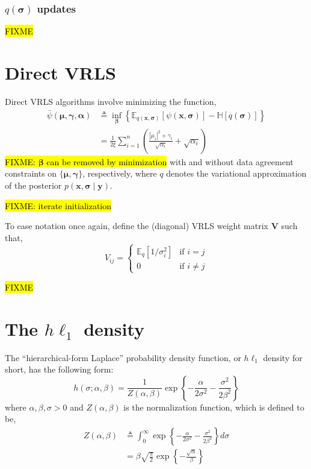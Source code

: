 \documentclass{article}
\newcommand{\m}[1]{\boldsymbol{#1}}
\newcommand{\E}[2]{\mathbb{E}_{#2}\left[ #1 \right]}
\newcommand{\entropy}[1]{\mathbb{H}\left[ #1 \right]}
\begin{document}
\subsubsection{$q(\m{\sigma})$ updates}
\hl{FIXME}

\section{Direct VRLS}
\label{s:vrls}
Direct VRLS algorithms involve minimizing the function,
\begin{equation}
\begin{aligned}
\bar\psi(\m{\mu}, \m{\gamma}, \m{\alpha}) &\triangleq
 \inf_{\m{\beta}} \left\{
  \E{\psi(\m{x}, \m{\sigma})}{q(\m{x}, \m{\sigma})} -
  \entropy{q(\m{\sigma})}
 \right\}
\\ &=
 \frac{1}{2 \xi} \sum_{i=1}^n \left(
  \frac{|\mu_i|^2 + \gamma_i}{\sqrt{\alpha_i}} + \sqrt{\alpha_i}
 \right)
\end{aligned}
\label{eq:psibar}
\end{equation}
\hl{FIXME: $\m{\beta}$ can be removed by minimization}
with and without data agreement constraints on $\{\m{\mu}, \m{\gamma}\}$,
respectively, where $q$ denotes the variational approximation of the
posterior $p(\m{x}, \m{\sigma} \mid \m{y})$.

\hl{FIXME: iterate initialization}

To ease notation once again, define
the (diagonal) VRLS weight matrix $\m{V}$ such that,
\begin{equation}
V_{ij} = \begin{cases}
 \E{1 / \sigma_i^2}{q} &\text{if } i = j \\
 0 &\text{if } i \ne j
\end{cases}
\label{eq:vmatrix}
\end{equation}

\hl{FIXME}

\section{The $h\ell_1$ density}
\label{s:hprior}
The ``hierarchical-form Laplace'' probability density function,
or $h\ell_1$ density for short, has the following form:
\begin{equation}
h(\sigma; \alpha, \beta) =
 \frac{1}{Z(\alpha, \beta)}
 \exp\left\{
  -\frac{\alpha}{2 \sigma^2}
  -\frac{\sigma^2}{2 \beta^2}
 \right\}
\label{eq:hprior}
\end{equation}
where $\alpha, \beta, \sigma > 0$ and $Z(\alpha, \beta)$ is the
normalization function, which is defined to be,
\begin{equation}
\begin{aligned}
Z(\alpha, \beta) &\triangleq
 \int_0^\infty \exp\left\{
  -\frac{\alpha}{2 \sigma^2}
  -\frac{\sigma^2}{2 \beta^2}
 \right\} d\sigma
\\ &=
 \beta \sqrt{\frac{\pi}{2}}
 \exp\left\{ -\frac{\sqrt{\alpha}}{\beta} \right\}
\end{aligned}
\label{eq:hprior_z}
\end{equation}
\end{document}
